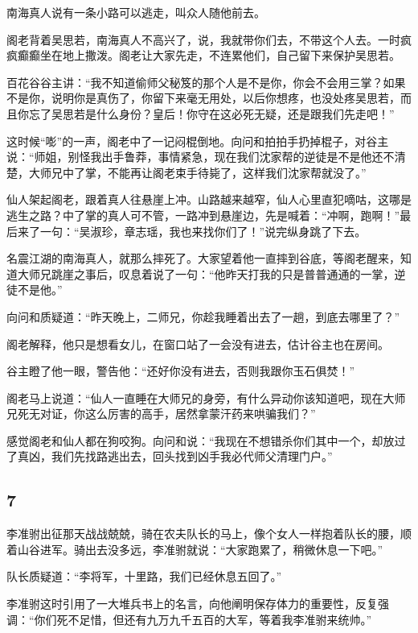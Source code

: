 南海真人说有一条小路可以逃走，叫众人随他前去。

阁老背着吴思若，南海真人不高兴了，说，我就带你们去，不带这个人去。一时疯疯癫癫坐在地上撒泼。阁老让大家先走，不连累他们，自己留下来保护吴思若。

百花谷谷主讲：“我不知道偷师父秘笈的那个人是不是你，你会不会用三掌？如果不是你，说明你是真伤了，你留下来毫无用处，以后你想疼，也没处疼吴思若，而且你忘了吴思若是什么身份？皇后！你守在这必死无疑，还是跟我们先走吧！”

这时候“嘭”的一声，阁老中了一记闷棍倒地。向问和拍拍手扔掉棍子，对谷主说：“师姐，别怪我出手鲁莽，事情紧急，现在我们沈家帮的逆徒是不是他还不清楚，大师兄中了掌，不能再让阁老束手待毙了，这样我们沈家帮就没了。”
\newline

仙人架起阁老，跟着真人往悬崖上冲。山路越来越窄，仙人心里直犯嘀咕，这哪是逃生之路？中了掌的真人可不管，一路冲到悬崖边，先是喊着：“冲啊，跑啊！”最后来了一句：“吴淑珍，章志瑶，我也来找你们了！”说完纵身跳了下去。

名震江湖的南海真人，就那么摔死了。大家望着他一直摔到谷底，等阁老醒来，知道大师兄跳崖之事后，叹息着说了一句：“他昨天打我的只是普普通通的一掌，逆徒不是他。”

向问和质疑道：“昨天晚上，二师兄，你趁我睡着出去了一趟，到底去哪里了？”

阁老解释，他只是想看女儿，在窗口站了一会没有进去，估计谷主也在房间。

谷主瞪了他一眼，警告他：“还好你没有进去，否则我跟你玉石俱焚！”

阁老马上说道：“仙人一直睡在大师兄的身旁，有什么异动你该知道吧，现在大师兄死无对证，你这么厉害的高手，居然拿蒙汗药来哄骗我们？”

感觉阁老和仙人都在狗咬狗。向问和说：“我现在不想错杀你们其中一个，却放过了真凶，我们先找路逃出去，回头找到凶手我必代师父清理门户。”
\newline

{\centering\subsection{7}}

李准驸出征那天战战兢兢，骑在农夫队长的马上，像个女人一样抱着队长的腰，顺着山谷进军。骑出去没多远，李准驸就说：“大家跑累了，稍微休息一下吧。”

队长质疑道：“李将军，十里路，我们已经休息五回了。”

李准驸这时引用了一大堆兵书上的名言，向他阐明保存体力的重要性，反复强调：“你们死不足惜，但还有九万九千五百的大军，等着我李准驸来统帅。”

